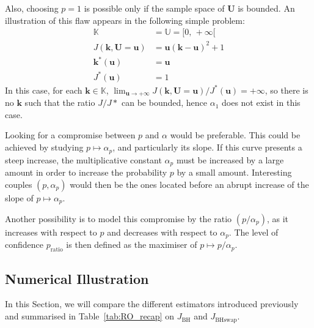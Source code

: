 \documentclass[preprint, 1p]{elsarticle}
\newcommand{\checkap}{{\alpha}_p}
\newcommand{\checka}{{\alpha}}
\newcommand{\Kspace}{\mathbb{K}}
\newcommand{\Uspace}{\mathbb{U}}
\newcommand{\JBH}{J_{\mathrm{BH}}}
\newcommand{\JBHS}{J_{\mathrm{BHswap}}}
\newcommand{\victor}[1]{{\itshape\color{green} ({#1})}}
\begin{document}
Also, choosing $p=1$ is possible only if the sample space of $\mathbf{U}$ is bounded. An illustration of this flaw appears in the following simple problem:
\begin{align*}
  \label{eq:Jinfinite}
  \Kspace &= \Uspace = [0,\,+\infty[ \\
  J(\mathbf{k},\mathbf{U}=\mathbf{u}) &= \mathbf{u}(\mathbf{k}-\mathbf{u})^2 + 1 \\
  \mathbf{k}^*(\mathbf{u}) &= \mathbf{u} \\
  J^*(\mathbf{u}) &= 1
\end{align*}
In this case, for each $\mathbf{k}\in \Kspace$, $\lim_{\mathbf{u} \rightarrow + \infty} {J(\mathbf{k},\mathbf{U}=\mathbf{u})/J^*(\mathbf{u})} = + \infty$, so there is no $\mathbf{k}$ such that the ratio $J/J *$ can be bounded, hence $\alpha_1$ does not exist in this case.


Looking for a compromise between $p$ and $\alpha$ would be preferable. This could be achieved by studying $p \mapsto \checkap$, and particularly its slope.
If this curve presents a steep increase, the multiplicative constant $\checkap$ must be increased by a large amount in order to increase the probability $p$ by a small amount. Interesting couples $(p,\checkap)$ would then be the ones located before an abrupt increase of the slope of $p \mapsto \checkap$.

Another possibility is to model this compromise by the ratio $(p/\checkap)$, as it increases with respect to $p$ and decreases with respect to $\checka_p$. The level of confidence $p_{\mathrm{ratio}}$ is then defined as the maximiser of $p\mapsto p / \checka_p$.







\subsection{Numerical Illustration}
\label{ssec:numerical_illustration}

In this Section, we will compare the different estimators introduced previously and summarised in Table~\ref{tab:RO_recap} on $\JBH$ and $\JBHS$.
\end{document}
